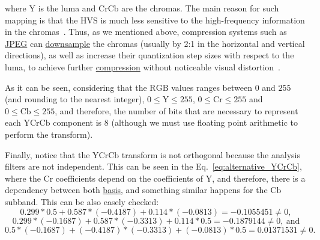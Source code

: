 where $\text{Y}$ is the luma and $\text{CrCb}$ are the chromas. The
main reason for such mapping is that the HVS is much less sensitive to
the high-frequency information in the
chromas~\cite{burger2016digital}. Thus, as we mentioned above,
compression systems such as
\href{https://en.wikipedia.org/wiki/JPEG}{JPEG} can
\href{https://en.wikipedia.org/wiki/Downsampling_(signal_processing)}{downsample}
the chromas (usually by 2:1 in the horizontal and vertical
directions), as well as increase their quantization step sizes with
respect to the luma, to achieve further
\href{https://en.wikipedia.org/wiki/Data_compression_ratio}{compression}
without noticeable visual distortion~\cite{malvar2008lifting}.

As it can be seen, considering that the $\text{RGB}$ values ranges
between $0$ and $255$ (and rounding to the nearest integer),
$0\le\text{Y}\le 255$, $0\le\text{Cr}\le 255$ and
$0\le\text{Cb}\le 255$, and therefore, the number of bits that are
necessary to represent each $\text{YCrCb}$ component is 8 (although we
must use floating point arithmetic to perform the transform).

Finally, notice that the $\text{YCrCb}$ transform is not orthogonal
because the analysis filters are not independent. This can be seen in
the Eq.~\ref{eq:alternative_YCrCb}, where the $\text{Cr}$ coefficients
depend on the coefficients of $\text{Y}$, and therefore, there is a
dependency between both
\href{https://en.wikipedia.org/wiki/Basis_(linear_algebra)}{basis},
and something similar happens for the $\text{Cb}$ subband. This can
be also easely checked: $$0.299*0.5 + 0.587*(-0.4187) +
0.114*(-0.0813) = -0.1055451 \neq 0,$$ $$0.299*(-0.1687) +
0.587*(-0.3313) + 0.114*0.5 = -0.1879144 \neq
0,~\mathrm{and}$$ $$0.5*(-0.1687) + (-0.4187)*(-0.3313 ) +
(-0.0813)*0.5 = 0.01371531 \neq 0.$$

